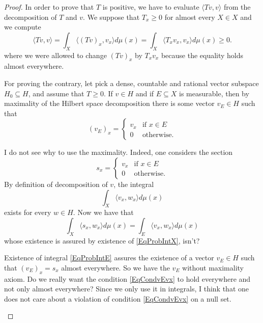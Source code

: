 \begin{proof}
	In order to prove that $T$ is positive, we have to evaluate $\langle Tv, v\rangle $ from the decomposition of $T$ and $v$. We suppose that $T_x\geq 0$ for almost every $X\in X$ and we compute
	\begin{equation}
		\langle Tv, v\rangle =\int_X\langle (Tv)_x, v_x\rangle d\mu(x)=\int_X\langle T_xv_x, v_x\rangle d\mu(x)\geq 0.
	\end{equation}
	where we were allowed to change $(Tv)_x$ by $T_xv_x$ because the equality holds almost everywhere.

	For proving the contrary, let pick a dense, countable and rational vector subspace $H_0\subseteq H$, and assume that $T\geq 0$. If $v\in H$ and if $E\subseteq X$ is measurable, then by maximality of the Hilbert space decomposition there is some vector $v_E\in H$ such that
	\begin{equation}		\label{EqCondvEvx}
		(v_E)_x=
	\begin{cases}
		v_x&\text{if }x\in E\\
		0&\text{otherwise.}
	\end{cases}
	\end{equation}

	\begin{probleme}		\label{ProbMaximvE}
	I do not see why to use the maximality. Indeed, one considers the section
	\begin{equation}
		s_x=
	\begin{cases}
		v_x&\text{if }x\in E\\
		0&\text{otherwise.}
	\end{cases}
	\end{equation}
	By definition of decomposition of $v$, the integral
	\begin{equation}		\label{EqProbIntX}
		\int_X\langle v_x, w_x\rangle d\mu(x)
	\end{equation}
	exists for every $w\in H$. Now we have that
	\begin{equation}		\label{EqProbIntE}
		\int_X\langle s_x, w_x\rangle d\mu(x)= \int_E\langle v_x, w_x\rangle d\mu(x)
	\end{equation}
	whose existence is assured by existence of \eqref{EqProbIntX}, isn't?

	Existence of integral \eqref{EqProbIntE} assures the existence of a vector $v_E\in H$ such that $(v_E)_x=s_x$ almost everywhere. So we have the $v_E$ without maximality axiom. Do we really want the condition \eqref{EqCondvEvx} to hold everywhere and not only almost everywhere? Since we only use it in integrals, I think that one does not care about a violation of condition \eqref{EqCondvEvx} on a null set.
	\end{probleme}


\end{proof}
